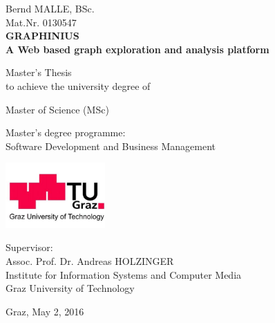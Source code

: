 
\begin{center}

{\large Bernd MALLE, BSc.} \\
{\large Mat.Nr. 0130547} \\
\vspace{1cm}
{\LARGE \textbf
{
GRAPHINIUS\\ A Web based graph exploration and analysis platform\\
}
}
\vspace{2cm}

{\larger
Master's Thesis \\[1ex]
to achieve the university degree of

Master of Science (MSc)

Master's degree programme:\\ 
Software Development and Business Management

}

\end{center}

\vspace{1cm}

\begin{center}
\includegraphics[height=2.5cm]{figures/tuglogo}

\vspace{2cm} %

{
Supervisor:\\
Assoc. Prof. Dr. Andreas HOLZINGER\\

Institute for Information Systems and Computer Media\\
Graz University of Technology


}
\vspace{1cm}

{
Graz, May 2, 2016 %
}

\end{center}





